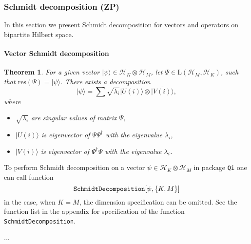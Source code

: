 \documentclass[11pt,a4paper]{article}
\newcommand{\qi}{\texttt{Qi}}
\newcommand{\res}{\mathrm{res}}
\newcommand{\ket}[1]{\ensuremath{|#1\rangle}}
\newcommand{\Hilb}[1]{\mathcal{H}_{#1}}
\newcommand{\Lin}{\mathrm{L}}
\newcommand{\1}{{\bf 1}}
\newtheorem{theorem}{Theorem}
\begin{document}
\subsubsection{Schmidt decomposition (ZP)}
In this section we present Schmidt decomposition for vectors and operators on
bipartite Hilbert space.

\paragraph{Vector Schmidt decomposition}
\begin{theorem} \label{th:Schmidt-Decomposition}
For a given vector  $\ket{\psi} \in \Hilb{K}\otimes \Hilb{M}$,
let $\Psi \in \Lin(\Hilb{M},\Hilb{K})$, such that $\res(\Psi) = \ket{\psi}$.
There exists a decomposition
\begin{equation}
 \ket{\psi} = 
 \sum \sqrt{\lambda_i} \ket{U(i)} \otimes \overline{\ket{V(i)}},
\end{equation}
where 
\begin{itemize}
 \item $\sqrt{\lambda_i}$ are singular values of matrix $\Psi$,
 \item $\ket{U(i)}$ is eigenvector of
$\Psi\Psi^{\dagger}$
 with the eigenvalue $\lambda_i$,
 \item $\ket{V(i)}$ is eigenvector of 
$\Psi^{\dagger} \Psi$
 with the eigenvalue $\lambda_i$.
\end{itemize}
\end{theorem}

To perform Schmidt decomposition on a vector $\psi \in \Hilb{K}\otimes \Hilb{M}$
in package \qi{} one can call function
\begin{equation}
\text{\texttt{SchmidtDecomposition}}[ \psi, \{K,M\}]
\end{equation} 
in the case, when $K=M$, the dimension specification can be omitted. See the
function list in the appendix for specification of the function
\texttt{SchmidtDecomposition}.

...
\end{document}
